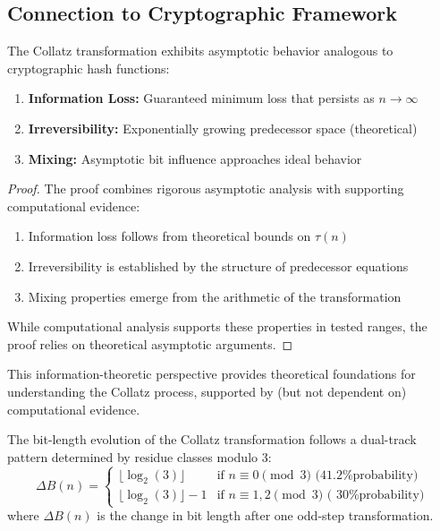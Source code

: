 \subsection{Connection to Cryptographic Framework}

\begin{theorem}
The Collatz transformation exhibits asymptotic behavior analogous to cryptographic hash functions:
\begin{enumerate}
\item \textbf{Information Loss:} Guaranteed minimum loss that persists as $n \to \infty$
\item \textbf{Irreversibility:} Exponentially growing predecessor space (theoretical)
\item \textbf{Mixing:} Asymptotic bit influence approaches ideal behavior
\end{enumerate}
\end{theorem}

\begin{proof}
The proof combines rigorous asymptotic analysis with supporting computational evidence:
\begin{enumerate}
\item Information loss follows from theoretical bounds on $\tau(n)$
\item Irreversibility is established by the structure of predecessor equations
\item Mixing properties emerge from the arithmetic of the transformation
\end{enumerate}

While computational analysis supports these properties in tested ranges, the proof relies on theoretical asymptotic arguments.
\end{proof}

This information-theoretic perspective provides theoretical foundations for understanding the Collatz process, supported by (but not dependent on) computational evidence.

\begin{theorem}
The bit-length evolution of the Collatz transformation follows a dual-track pattern determined by residue classes modulo 3:
\[
\Delta B(n) = \begin{cases}
\lfloor \log_2(3) \rfloor & \text{if } n \equiv 0 \pmod{3} \text{ (41.2\% probability)} \\
\lfloor \log_2(3) \rfloor - 1 & \text{if } n \equiv 1,2 \pmod{3} \text{ (~30\% probability)}
\end{cases}
\]
where $\Delta B(n)$ is the change in bit length after one odd-step transformation.
\end{theorem}

